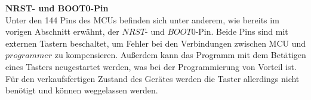 \newline
\textbf{NRST- und BOOT0-Pin}\\
Unter den 144 Pins des MCUs befinden sich unter anderem, wie bereits im vorigen Abschnitt erwähnt, der $NRST$- und $BOOT0$-Pin. Beide Pins sind mit externen Tastern beschaltet, um Fehler bei den Verbindungen zwischen MCU und $programmer$ zu kompensieren. Außerdem kann das Programm mit dem Betätigen eines Tasters neugestartet werden, was bei der Programmierung von Vorteil ist. Für den verkaufsfertigen Zustand des Gerätes werden die Taster allerdings nicht benötigt und können weggelassen werden. 